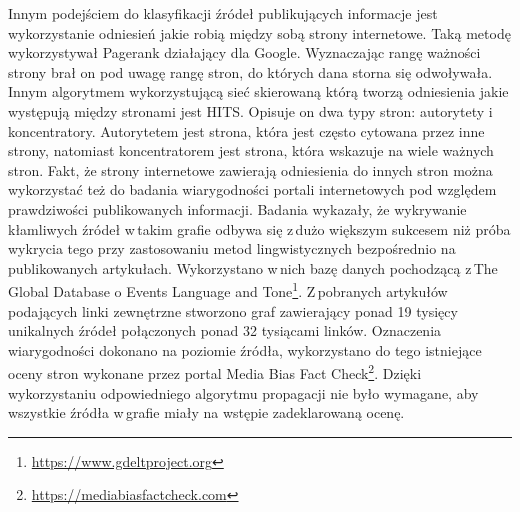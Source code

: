 \par
Innym podejściem do klasyfikacji źródeł publikujących informacje jest wykorzystanie odniesień jakie robią między sobą strony internetowe. Taką metodę wykorzystywał Pagerank działający dla Google. Wyznaczając rangę ważności strony brał on pod uwagę rangę stron, do których dana storna się odwoływała. Innym algorytmem wykorzystującą sieć skierowaną którą tworzą odniesienia jakie występują między stronami jest HITS. Opisuje on dwa typy stron: autorytety i\,koncentratory. Autorytetem jest strona, która jest często cytowana przez inne strony, natomiast koncentratorem jest strona, która wskazuje na wiele ważnych stron. Fakt, że strony internetowe zawierają odniesienia do innych stron można wykorzystać też do badania wiarygodności portali internetowych pod względem prawdziwości publikowanych informacji. Badania wykazały, że wykrywanie kłamliwych źródeł w\,takim grafie odbywa się z\,dużo większym sukcesem niż próba wykrycia tego przy zastosowaniu metod lingwistycznych bezpośrednio na publikowanych artykułach\cite{fairbanks2018credibility}. Wykorzystano w\,nich bazę danych pochodzącą z\,The Global Database o Events Language and Tone\footnote{\url{https://www.gdeltproject.org}}. Z\,pobranych artykułów podających linki zewnętrzne stworzono graf zawierający ponad 19 tysięcy unikalnych źródeł połączonych ponad 32 tysiącami linków. Oznaczenia wiarygodności dokonano na poziomie źródła, wykorzystano do tego istniejące oceny stron wykonane przez portal Media Bias Fact Check\footnote{\url{https://mediabiasfactcheck.com}}. Dzięki wykorzystaniu odpowiedniego algorytmu propagacji nie było wymagane, aby wszystkie źródła w\,grafie miały na wstępie zadeklarowaną ocenę. 